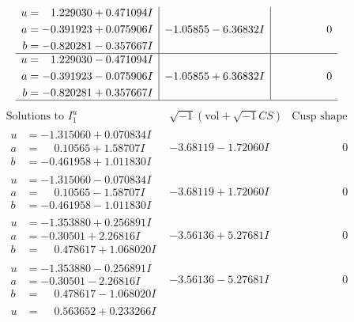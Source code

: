 \documentclass[1p]{elsarticle_modified}
\theoremstyle{definition}
\newcommand{\I}{\sqrt{-1}}
\begin{document}
$$\begin{array}{c|c|c}
\begin{aligned}
u &= \phantom{-}1.229030 + 0.471094 I \\
a &= -0.391923 + 0.075906 I \\
b &= -0.820281 - 0.357667 I\end{aligned}
 & -1.05855 - 6.36832 I & \phantom{-0.000000 } 0 \\ \hline\begin{aligned}
u &= \phantom{-}1.229030 - 0.471094 I \\
a &= -0.391923 - 0.075906 I \\
b &= -0.820281 + 0.357667 I\end{aligned}
 & -1.05855 + 6.36832 I & \phantom{-0.000000 } 0\\
 \hline 
 \end{array}$$\newpage$$\begin{array}{c|c|c}  
\text{Solutions to }I^u_{1}& \I (\text{vol} + \sqrt{-1}CS) & \text{Cusp shape}\\
 \hline 
\begin{aligned}
u &= -1.315060 + 0.070834 I \\
a &= \phantom{-}0.10565 + 1.58707 I \\
b &= -0.461958 + 1.011830 I\end{aligned}
 & -3.68119 - 1.72060 I & \phantom{-0.000000 } 0 \\ \hline\begin{aligned}
u &= -1.315060 - 0.070834 I \\
a &= \phantom{-}0.10565 - 1.58707 I \\
b &= -0.461958 - 1.011830 I\end{aligned}
 & -3.68119 + 1.72060 I & \phantom{-0.000000 } 0 \\ \hline\begin{aligned}
u &= -1.353880 + 0.256891 I \\
a &= -0.30501 + 2.26816 I \\
b &= \phantom{-}0.478617 + 1.068020 I\end{aligned}
 & -3.56136 + 5.27681 I & \phantom{-0.000000 } 0 \\ \hline\begin{aligned}
u &= -1.353880 - 0.256891 I \\
a &= -0.30501 - 2.26816 I \\
b &= \phantom{-}0.478617 - 1.068020 I\end{aligned}
 & -3.56136 - 5.27681 I & \phantom{-0.000000 } 0 \\ \hline\begin{aligned}
u &= \phantom{-}0.563652 + 0.233266 I \\

\end{aligned}
\end{array}$$
\end{document}
